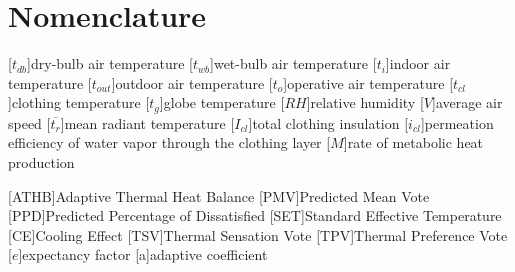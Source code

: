 
\section*{Nomenclature}
\renewcommand{\baselinestretch}{0.75}\normalsize
\renewcommand{\aclabelfont}[1]{\textsc{\acsfont{#1}}}
\begin{acronym}[longest]

    [$t_{db}$]{dry-bulb air temperature}
    [$t_{wb}$]{wet-bulb air temperature}
    [$t_{i}$]{indoor air temperature}
    [$t_{out}$]{outdoor air temperature}
    [$t_{o}$]{operative air temperature}
    [$t_{cl}$]{clothing temperature}
    [$t_{g}$]{globe temperature}
    [$RH$]{relative humidity\acroextra{, \%}}
    [$V$]{average air speed}
    [$\overline{t_{r}}$]{mean radiant temperature}
    [$I_{cl}$]{total clothing insulation}
    [$i_{cl}$]{permeation efficiency of water vapor through the clothing layer}
    [$M$]{rate of metabolic heat production}

    [ATHB]{Adaptive Thermal Heat Balance}
    [PMV]{Predicted Mean Vote}
    [PPD]{Predicted Percentage of Dissatisfied\acroextra{, \%}}
    [SET]{Standard Effective Temperature}
    [CE]{Cooling Effect}
    [TSV]{Thermal Sensation Vote}
    [TPV]{Thermal Preference Vote}
    [$e$]{expectancy factor}
    [a]{adaptive coefficient}


\end{acronym}
